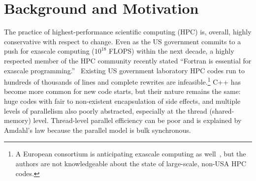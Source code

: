 \documentclass{llncs}
\begin{document}
\begin{abstract}
The trend is functional programming in scientific computing, and in particular
strict (by default) functional programming, in various guises.  Our project is
the demonstration of a light-weight, higher-order, polymorphic pure functional
language implementation in which we can experiment with automatic
parallelization strategies and varying degrees of default strictness.
Strictness prescribes the degree of potential parallelism, that is, we are not
exploring speculative evaluation.

\emph{Preliminary paper note 1: We are reporting work in progress.  At the
  time of writing we have a complete serial implementation, a primitive
  proof-of-concept parallel implementation, and are currently developing a
  more realistic parallel runtime.  We expect to have preliminary results from
  our new parallel implementation by the time of the symposium.}

\emph{Note 2: While this does not qualify as a student paper, students
  (undergraduate!)  have contributed considerably to this effort, and if
  accepted we plan to have one of these students present this paper.}

\emph{Note 3: Hopefully in the spirit of a student-friendly workshop, in this
  draft we have chosen a more conversational style of presentation than
  necessarily appropriate for a final paper, and have also highlighted the
  major student contributions, and perhaps gratuitous detail about process.}


\end{abstract}

\section{Background and Motivation}
The practice of highest-performance scientific computing (HPC) is, overall,
highly conservative with respect to change.  Even as the US government commits
to a push for exascale computing ($10^{18}$ FLOPS) within the next decade, a
highly respected member of the HPC community recently stated ``Fortran is
essential for exascale programming.''~\cite{Heroux16} Existing US government
laboratory HPC codes run to hundreds of thousands of lines and complete
rewrites are infeasible.\footnote{A European consortium is anticipating
  exascale computing as well~\cite{EUexascale}, but the authors are not
  knowledgeable about the state of large-scale, non-USA HPC codes.}  C++ has
become more common for new code starts, but their nature remains the same:
huge codes with fair to non-existent encapsulation of side effects, and
multiple levels of parallelism also poorly abstracted, especially at the
thread (shared-memory) level.  Thread-level parallel efficiency can be poor
and is explained by Amdahl's law because the parallel model is bulk
synchronous.
\end{document}
